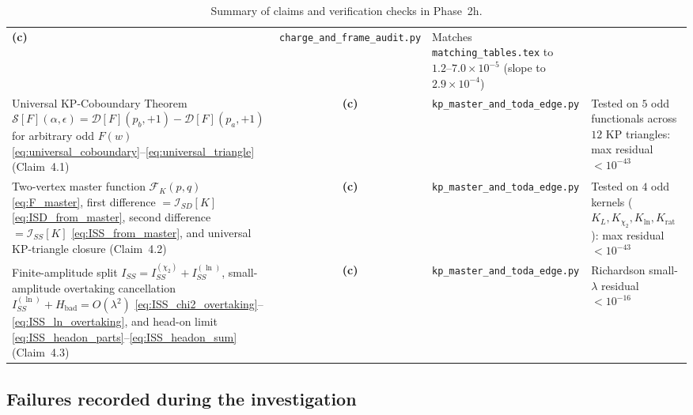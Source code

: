 \documentclass[11pt,a4paper]{article}
\begin{document}
\begin{table}[ht]
\begin{tabular}{@{}p{6.6cm}cp{4.4cm}p{3.6cm}@{}}
\textbf{(c)} & \texttt{charge\_and\_frame\_audit.py} &
Matches \texttt{matching\_tables.tex} to $1.2\text{--}7.0\times 10^{-5}$ (slope to $2.9\times 10^{-4}$) \\
\addlinespace
Universal KP-Coboundary Theorem $\mathcal{S}[F](\alpha,\epsilon) = \mathcal{D}[F](p_b,+1) - \mathcal{D}[F](p_a,+1)$ for arbitrary odd $F(w)$ \eqref{eq:universal_coboundary}--\eqref{eq:universal_triangle} (Claim~4.1) &
\textbf{(c)} & \texttt{kp\_master\_and\_toda\_edge.py} &
Tested on $5$ odd functionals across $12$ KP triangles: max residual $< 10^{-43}$ \\
\addlinespace
Two-vertex master function $\mathcal{F}_K(p,q)$ \eqref{eq:F_master}, first difference $=\mathcal{I}_{SD}[K]$ \eqref{eq:ISD_from_master}, second difference $=\mathcal{I}_{SS}[K]$ \eqref{eq:ISS_from_master}, and universal KP-triangle closure (Claim~4.2) &
\textbf{(c)} & \texttt{kp\_master\_and\_toda\_edge.py} &
Tested on $4$ odd kernels ($K_L,K_{\chi_2},K_{\ln},K_{\mathrm{rat}}$): max residual $< 10^{-43}$ \\
\addlinespace
Finite-amplitude split $I_{SS} = I_{SS}^{(\chi_2)} + I_{SS}^{(\ln)}$, small-amplitude overtaking cancellation $I_{SS}^{(\ln)} + H_{\mathrm{bad}} = O(\lambda^2)$ \eqref{eq:ISS_chi2_overtaking}--\eqref{eq:ISS_ln_overtaking}, and head-on limit \eqref{eq:ISS_headon_parts}--\eqref{eq:ISS_headon_sum} (Claim~4.3) &
\textbf{(c)} & \texttt{kp\_master\_and\_toda\_edge.py} &
Richardson small-$\lambda$ residual $< 10^{-16}$ \\
\bottomrule
\end{tabular}
\caption{Summary of claims and verification checks in Phase~2h.}
\label{tab:summary}
\end{table}

\subsection*{Failures recorded during the investigation}
\end{document}
